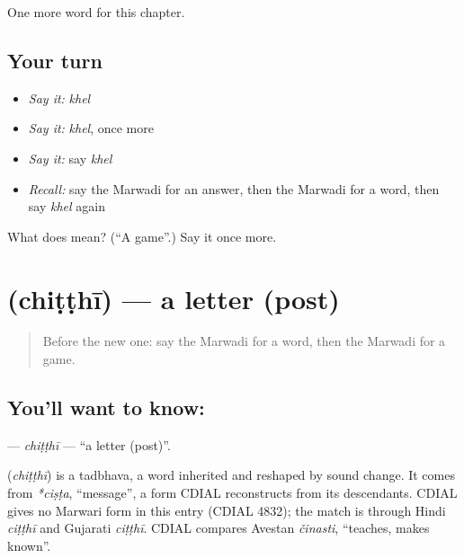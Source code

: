 \begin{grammarlens}[title={What you've built}]
One more word for this chapter.
\end{grammarlens}

\subsection*{Your turn}
\begin{itemize}
\raggedright
  \item \emph{Say it:} \emph{khel}
  \item \emph{Say it:} \emph{khel}, once more
  \item \emph{Say it:} say \emph{khel}
  \item \emph{Recall:} say the Marwadi for an answer, then the Marwadi for a word, then say \emph{khel} again
\end{itemize}

\begin{tcolorbox}[breakable,colback=teal!4,colframe=teal!35!black,title={Before you move on}]
What does  mean? (\textquotedblleft{}A game\textquotedblright{}.) Say it once more.
\end{tcolorbox}
\section[\texorpdfstring{\mw{चिट्ठी} (chiṭṭhī)}{चिट्ठी (chiṭṭhī)}]{ (chiṭṭhī) — a letter (post)}

\label{lesson:MW-C67-chitthi}



\begin{quote}
Before the new one: say the Marwadi for a word, then the Marwadi for a game.
\end{quote}

\subsection*{You'll want to know: }
\textbf{} — \emph{chiṭṭhī} — \textquotedblleft{}a letter (post)\textquotedblright{}.

\begin{cousinweb}
\textbf{} (\emph{chiṭṭhī}) is a tadbhava, a word inherited and reshaped by sound change. It comes from \emph{*ciṣṭa}, \textquotedblleft{}message\textquotedblright{}, a form CDIAL reconstructs from its descendants. CDIAL gives no Marwari form in this entry (CDIAL 4832); the match is through Hindi \emph{ciṭṭhī} and Gujarati \emph{ciṭṭhī}. CDIAL compares Avestan \emph{činasti}, \textquotedblleft{}teaches, makes known\textquotedblright{}.
\end{cousinweb}

